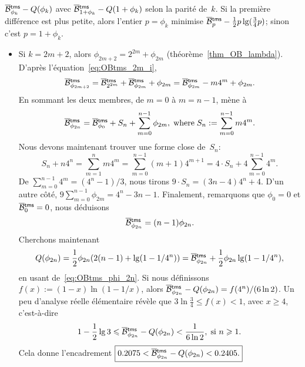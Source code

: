 \(\OB{\fun{tms}}{\phi_k} - Q(\phi_k)\) avec \(\OB{\fun{tms}}{1+\phi_k}
- Q(1+\phi_k)\) selon la parité de~\(k\). Si la première différence
est plus petite, alors l'entier \(p=\phi_k\) minimise
\(\OB{\fun{tms}}{p} - \tfrac{1}{2}p\lg(\tfrac{3}{4}p)\); sinon c'est
\(p=1+\phi_k\).
\begin{itemize}

  \item Si \(k=2m+2\), alors \(\phi_{2m+2} = 2^{2m} + \phi_{2m}\)
    (théorème~\ref{thm_OB_lambda}). D'après
    l'équation~\eqref{eq:OBtms_2m_i},
    \begin{equation*}
      \OB{\fun{tms}}{\phi_{2m+2}} = \OB{\fun{tms}}{2^{2m}} +
    \OB{\fun{tms}}{\phi_{2m}} + \phi_{2m} = \OB{\fun{tms}}{\phi_{2m}}
    - m4^m + \phi_{2m}.
    \end{equation*}
    En sommant les deux membres, de \(m=0\) à \(m=n-1\), mène à
    \begin{equation*}
      \OB{\fun{tms}}{\phi_{2n}} = \OB{\fun{tms}}{\phi_0} + S_n
    + \sum_{m=0}^{n-1}{\phi_{2m}},\; \text{where}\; S_n :=
    \sum_{m=0}^{n-1}{m4^m}.
    \end{equation*}
    Nous devons maintenant trouver une forme close de~\(S_n\):
    \begin{equation*}
      S_n + n4^n = \sum_{m=1}^{n}{m4^m}
                 = \sum_{m=0}^{n-1}(m+1)4^{m+1}
                 = 4 \cdot S_n + 4\sum_{m=0}^{n-1}4^m.
    \end{equation*}
    De \(\sum_{m=0}^{n-1}4^m = (4^n-1)/3\), nous tirons \(9 \cdot S_n
    = (3n -4)4^n + 4\). D'un autre côté, \(9
    \sum_{m=0}^{n-1}{\phi_{2m}} = 4^n - 3n - 1\). Finalement,
    remarquons que \(\phi_0 = 0\) et \(\OB{\fun{tms}}{0} = 0\), nous
    déduisons
    \begin{equation}
      \OB{\fun{tms}}{\phi_{2n}} = (n-1)\phi_{2n}.
      \label{eq:OBtms_phi_2n}
    \end{equation}
    Cherchons maintenant
    \begin{equation*}
      Q(\phi_{2n}) = \frac{1}{2}\phi_{2n}(2(n-1)
      + \lg(1-1/4^n)) = \OB{\fun{tms}}{\phi_{2n}}
      + \frac{1}{2}\phi_{2n}\lg(1-1/4^n),
    \end{equation*}
    en usant de~\eqref{eq:OBtms_phi_2n}. Si nous définissons \(f(x) :=
    (1-x) \ln(1-1/x)\), alors \(\OB{\fun{tms}}{\phi_{2n}} -
    Q(\phi_{2n}) = f(4^n)/(6\ln 2)\). Un peu d'analyse réelle
    élémentaire révèle que \(3\ln\tfrac{3}{4} \leqslant f(x) < 1\),
    avec \(x \geqslant 4\), c'est-à-dire
    \begin{equation*}
      1 - \frac{1}{2}\lg 3 \leqslant
    \OB{\fun{tms}}{\phi_{2n}} - Q(\phi_{2n}) < \frac{1}{6\ln 2},\; \text{si \(n
      \geqslant 1\)}.
    \end{equation*}
    Cela donne l'encadrement \(\boxed{0.2075 <
      \OB{\fun{tms}}{\phi_{2n}} - Q(\phi_{2n}) < 0.2405.}\)


\end{itemize}
